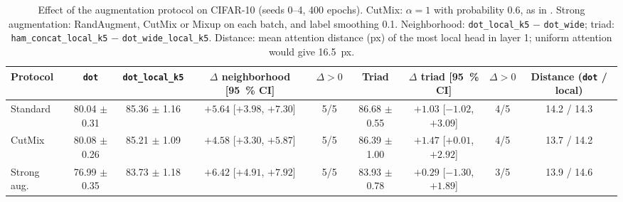 
\begin{table}[!t]
\centering
\small
\caption{Effect of the augmentation protocol on CIFAR-10 (seeds 0--4, 400 epochs). CutMix: $\alpha=1$ with probability 0.6, as in \cite{santiago2026inducing}. Strong augmentation: RandAugment, CutMix or Mixup on each batch, and label smoothing 0.1. Neighborhood: \texttt{dot\_local\_k5} $-$ \texttt{dot\_wide}; triad: \texttt{ham\_concat\_local\_k5} $-$ \texttt{dot\_wide\_local\_k5}. Distance: mean attention distance (px) of the most local head in layer 1; uniform attention would give 16.5~px.}
\label{tab:aumento}
\begin{adjustbox}{max width=\linewidth}
\begin{tabular}{lcccccccc}
\toprule
Protocol & \texttt{dot} & \texttt{dot\_local\_k5} & $\Delta$ neighborhood [95~\% CI] & $\Delta>0$ & Triad & $\Delta$ triad [95~\% CI] & $\Delta>0$ & Distance (\texttt{dot} / local) \\
\midrule
Standard & 80.04 $\pm$ 0.31 & 85.36 $\pm$ 1.16 & $+5.64$ [$+3.98$, $+7.30$] & 5/5 & 86.68 $\pm$ 0.55 & $+1.03$ [$-1.02$, $+3.09$] & 4/5 & 14.2 / 14.3 \\
CutMix & 80.08 $\pm$ 0.26 & 85.21 $\pm$ 1.09 & $+4.58$ [$+3.30$, $+5.87$] & 5/5 & 86.39 $\pm$ 1.00 & $+1.47$ [$+0.01$, $+2.92$] & 4/5 & 13.7 / 14.2 \\
Strong aug. & 76.99 $\pm$ 0.35 & 83.73 $\pm$ 1.18 & $+6.42$ [$+4.91$, $+7.92$] & 5/5 & 83.93 $\pm$ 0.78 & $+0.29$ [$-1.30$, $+1.89$] & 3/5 & 13.9 / 14.6 \\
\bottomrule
\end{tabular}
\end{adjustbox}
\end{table}
